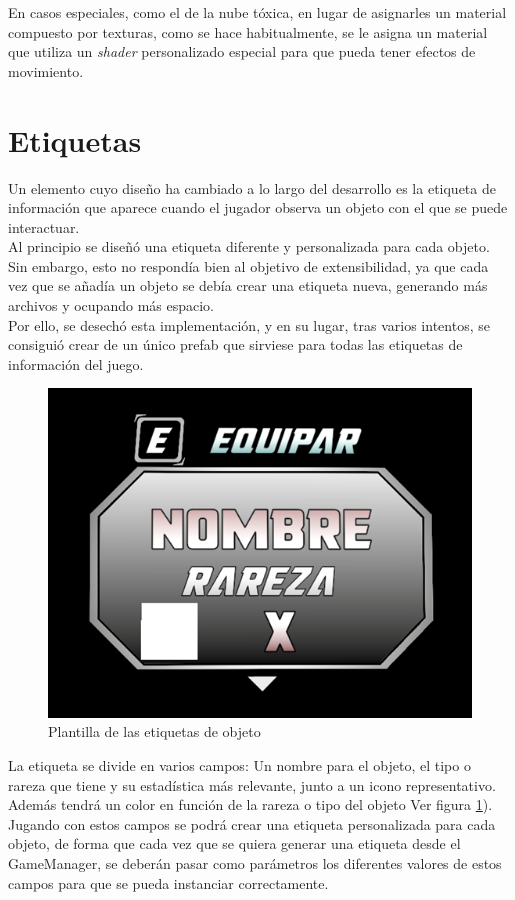 \begin{enumerate}
    En casos especiales, como el de la nube tóxica, en lugar de asignarles un material compuesto por texturas, como se hace habitualmente, se le asigna un material que utiliza un \textit{shader} personalizado especial para que pueda tener efectos de movimiento.
\end{enumerate}
\section{Etiquetas}
Un elemento cuyo diseño ha cambiado a lo largo del desarrollo es la etiqueta de información que aparece cuando el jugador observa un objeto con el que se puede interactuar.\\
Al principio se diseñó una etiqueta diferente y personalizada para cada objeto. Sin embargo, esto no respondía bien al objetivo de extensibilidad, ya que cada vez que se añadía un objeto se debía crear una etiqueta nueva, generando más archivos y ocupando más espacio.\\
Por ello, se desechó esta implementación, y en su lugar, tras varios intentos, se consiguió crear de un único prefab que sirviese para todas las etiquetas de información del juego.
\begin{figure}[h]
	\centering
	\includegraphics[scale=0.4]{img/LabelEmpty.png}
	\caption{Plantilla de las etiquetas de objeto}
	\label{fig:PlantillaEtiqueta}
    \end{figure}
La etiqueta se divide en varios campos: Un nombre para el objeto, el tipo o rareza que tiene y su estadística más relevante, junto a un icono representativo. Además tendrá un color en función de la rareza o tipo del objeto Ver figura \ref{fig:PlantillaEtiqueta}).
Jugando con estos campos se podrá crear una etiqueta personalizada para cada objeto, de forma que cada vez que se quiera generar una etiqueta desde el GameManager, se deberán pasar como parámetros los diferentes valores de estos campos para que se pueda instanciar correctamente.

